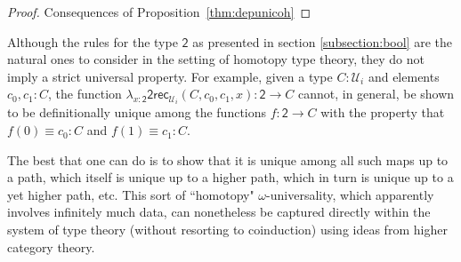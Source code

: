 \documentclass[reqno,10pt,a4paper,oneside]{amsart}
\newcommand{\lam}[1]{\lambda_{#1}}
\newcommand{\Bool}{\mathsf{2}}
\newcommand{\boolrec}{\mathsf{2rec}_{\UU_i}}
\newcommand{\UU}{\mathcal{U}}
\numberwithin{equation}{section}
\theoremstyle{mythm}
\theoremstyle{mydef}
\theoremstyle{myrmk}
\begin{document}
\begin{proof}  Consequences of Proposition~\ref{thm:depunicoh}
\end{proof} 


Although the rules for the type $\Bool$ as presented in section \ref{subsection:bool} are the natural ones to consider in the setting of homotopy type theory, they do not imply a strict universal property. For example, given a type $C:\UU_i$ and elements $c_0, c_1 : C$, the function $\lam{x:\Bool}\boolrec(C,c_0,c_1,x) : \Bool \rightarrow C$ cannot, in general, be shown to be definitionally unique among the functions $f : \Bool \rightarrow C$ with the property that $f(0) \equiv c_0 : C$ and $f(1) \equiv c_1 : C$.

The best that one can do is to show that it is unique among all such maps up to a path, which itself is unique up to a higher path, which in turn is unique up to a yet higher path, etc. This sort of ``homotopy" $\omega$-universality, which apparently involves infinitely much data, can nonetheless be captured directly within the system of type theory (without resorting to coinduction) using ideas from higher category theory. 
\end{document}
